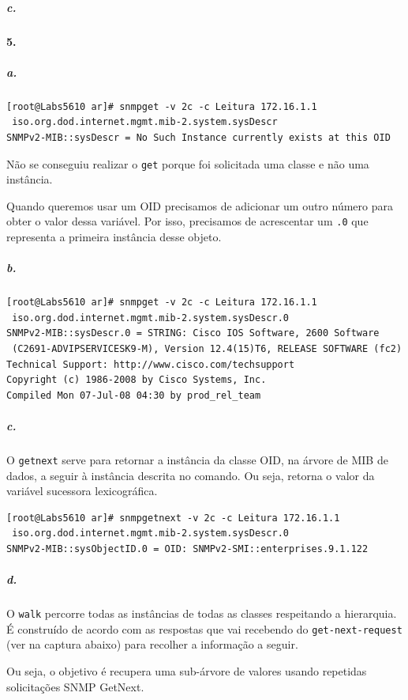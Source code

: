 \newpage

\subparagraph{c.}


\paragraph{5.}

\subparagraph{a.}
\begin{verbatim}
[root@Labs5610 ar]# snmpget -v 2c -c Leitura 172.16.1.1
 iso.org.dod.internet.mgmt.mib-2.system.sysDescr
SNMPv2-MIB::sysDescr = No Such Instance currently exists at this OID
\end{verbatim}

Não se conseguiu realizar o \texttt{get} porque foi solicitada uma classe e não uma instância.

Quando queremos usar um OID precisamos de adicionar um outro número para obter o valor dessa variável. Por isso, precisamos de acrescentar um \texttt{.0} que representa a primeira instância desse objeto.


\subparagraph{b.}
\begin{verbatim}
[root@Labs5610 ar]# snmpget -v 2c -c Leitura 172.16.1.1
 iso.org.dod.internet.mgmt.mib-2.system.sysDescr.0
SNMPv2-MIB::sysDescr.0 = STRING: Cisco IOS Software, 2600 Software
 (C2691-ADVIPSERVICESK9-M), Version 12.4(15)T6, RELEASE SOFTWARE (fc2)
Technical Support: http://www.cisco.com/techsupport
Copyright (c) 1986-2008 by Cisco Systems, Inc.
Compiled Mon 07-Jul-08 04:30 by prod_rel_team
\end{verbatim}


\subparagraph{c.}
O \texttt{getnext} serve para retornar a instância da classe OID, na árvore de MIB de dados, a seguir à instância descrita no comando. Ou seja, retorna o valor da variável sucessora lexicográfica.


\begin{verbatim}
[root@Labs5610 ar]# snmpgetnext -v 2c -c Leitura 172.16.1.1
 iso.org.dod.internet.mgmt.mib-2.system.sysDescr.0
SNMPv2-MIB::sysObjectID.0 = OID: SNMPv2-SMI::enterprises.9.1.122
\end{verbatim}


\subparagraph{d.}
O \texttt{walk} percorre todas as instâncias de todas as classes respeitando a hierarquia. É construído de  acordo com  as  respostas  que  vai  recebendo  do  \texttt{get-next-request} (ver  na captura abaixo) para recolher a informação a seguir.

Ou seja, o objetivo é recupera uma sub-árvore de valores usando repetidas solicitações SNMP GetNext.

